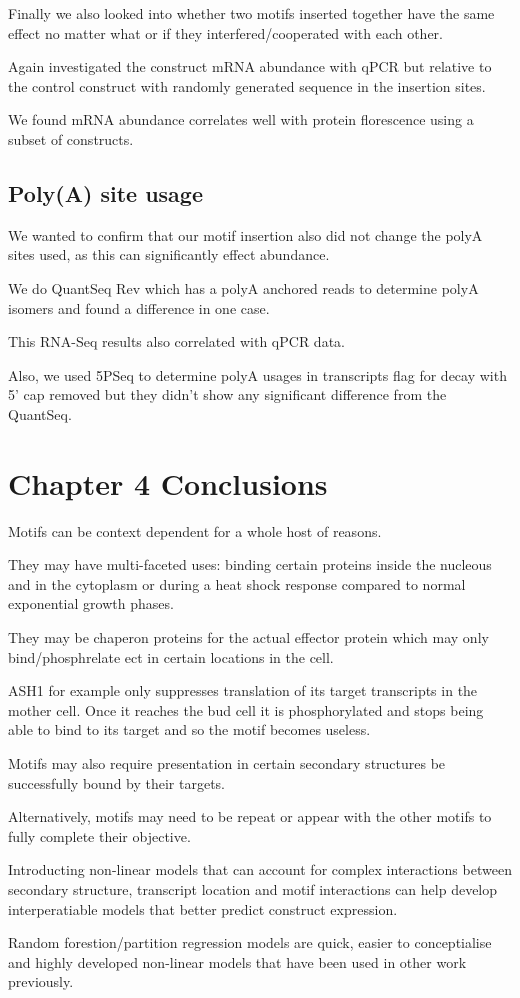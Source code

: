 \documentclass{SBCbookchapter}
\begin{document}
Finally we also looked into whether two motifs inserted together have the same effect no matter what or if they interfered/cooperated with each other.

Again investigated the construct mRNA abundance with qPCR but relative to the control construct with randomly generated sequence in the insertion sites.

We found mRNA abundance correlates well with protein florescence using a subset of constructs.

\subsection{Poly(A) site usage}

We wanted to confirm that our motif insertion also did not change the polyA sites used, as this can significantly effect abundance.

We do QuantSeq Rev which has a polyA anchored reads to determine polyA isomers and found a difference in one case.

This RNA-Seq results also correlated with qPCR data.

Also, we used 5PSeq to determine polyA usages in transcripts flag for decay with 5' cap removed but they didn't show any significant difference from the QuantSeq.

\section{Chapter 4 Conclusions}

Motifs can be context dependent for a whole host of reasons.

They may have multi-faceted uses: binding certain proteins inside the nucleous and in the cytoplasm or during a heat shock response compared to normal exponential growth phases.

They may be chaperon proteins for the actual effector protein which may only bind/phosphrelate ect in certain locations in the cell.

ASH1 for example only suppresses translation of its target transcripts in the mother cell. Once it reaches the bud cell it is phosphorylated and stops being able to bind to its target and so the motif becomes useless.

Motifs may also require presentation in certain secondary structures be successfully bound by their targets.

Alternatively, motifs may need to be repeat or appear with the other motifs to fully complete their objective.

Introducting non-linear models that can account for complex interactions between secondary structure, transcript location and motif interactions can help develop interperatiable models that better predict construct expression.

Random forestion/partition regression models are quick, easier to conceptialise and highly developed non-linear models that have been used in other work previously.



\end{document}
